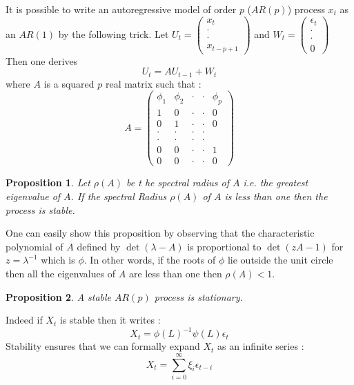 \documentclass{article}
\newtheorem{Prop}{Proposition}[section]
\begin{document}
It is possible to write an autoregressive model of order $p$  ($AR(p)$) process $x_t$ as an $AR(1)$ by the following trick. Let $U_t=\begin{pmatrix} x_t\\
\cdot\\
\cdot\\
x_{t-p+1}
\end{pmatrix}$ and $W_t=\begin{pmatrix} \epsilon_t\\
\cdot\\
\cdot\\
0
\end{pmatrix}$ Then one derives \begin{equation}\label{VAR_ptoVAR_1}
    U_t=AU_{t-1}+W_t
\end{equation} where $A$ is a squared $p$ real matrix such that : \begin{equation*}
A=\begin{pmatrix} 
\phi_1 & \phi_2 & \cdot & \cdot & \phi_p \\
1  & 0 & \cdot & \cdot & 0\\
0 & 1 & \cdot & \cdot & 0 \\
\cdot & \cdot & \cdot & \cdot \\
\cdot & \cdot & \cdot & \cdot \\
0 & 0 & \cdot & \cdot & 1 \\
0 & 0 &  \cdot & \cdot & 0
\end{pmatrix}
\end{equation*}
\begin{Prop}
Let $\rho(A)$ be t he spectral radius of $A$ i.e. the greatest eigenvalue of $A$. If the spectral Radius $\rho(A)$ of $A$ is less than one then the process is stable.
\end{Prop}
One can easily show this proposition by observing that the characteristic polynomial of $A$ defined by $\det(\lambda -A)$ is proportional to $\det(zA-1)$ for $z=\lambda^{-1}$ which is $\phi$. In other words, if the roots of $\phi$ lie outside the unit circle then all the eigenvalues of $A$ are less than one then $\rho(A)<1$.
\begin{Prop}
A stable $AR(p)$ process is stationary.
\end{Prop}
Indeed if $X_t$ is stable then it writes : 
\begin{equation*}
    X_t=\phi(L)^{-1}\psi(L)\epsilon_t
\end{equation*}
Stability ensures that we can formally expand $X_t$ as an infinite series : 
\begin{equation*}
    X_t=\sum_{i=0}^{\infty}\xi_i\epsilon_{t-i}
\end{equation*}
\end{document}
